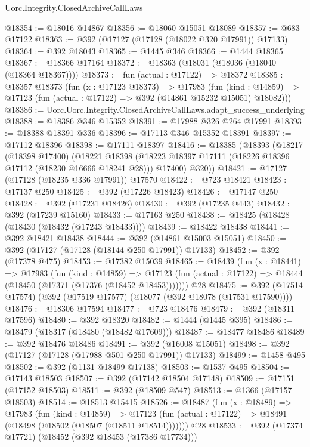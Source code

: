 \begin{lexlean}{Uorc.Integrity.ClosedArchiveCallLaws}
\begin{coremodule}
@18354 := @18016 @14867
@18356 := @18060 @15051 @18089
@18357 := @683 @17122
@18363 := @392 (@17127 (@17128 (@18022 @320 @17991)) @17133)
@18364 := @392 @18043
@18365 := @1445 @346
@18366 := @1444 @18365
@18367 := @18366 @17164
@18372 := @18363 (@18031 (@18036 (@18040 (@18364 @18367))))
@18373 := fun (actual : @17122) => @18372
@18385 := @18357
    @18373
    (fun (x : @17123 @18373) =>
    @17983
      (fun (kind : @14859) => @17123 (fun (actual : @17122) => @392 (@14861 @15232 @15051) @18082)))
@18386 := Uorc.Uorc.Integrity.ClosedArchiveCallLaws.adapt_success_underlying
@18388 := @18386 @346 @15352
@18391 := @17988 @326 @264 @17991
@18393 := @18388 @18391 @336
@18396 := @17113 @346 @15352 @18391
@18397 := @17112 @18396
@18398 := @17111 @18397
@18416 := @18385
    (@18393
      (@18217
        (@18398 @17400)
        (@18221
          @18398
          (@18223 @18397 @17111 (@18226 @18396 @17112 (@18230 @16666 @18241 @28)))
          @17400)
        @320))
@18421 := @17127 (@17128 (@18235 @336 @17991)) @17570
@18422 := @723 @18421
@18423 := @17137 @250
@18425 := @392 (@17226 @18423)
@18426 := @17147 @250
@18428 := @392 (@17231 @18426)
@18430 := @392 (@17235 @443)
@18432 := @392 (@17239 @15160)
@18433 := @17163 @250
@18438 := @18425 (@18428 (@18430 (@18432 (@17243 @18433))))
@18439 := @18422 @18438
@18441 := @392 @18421 @18438
@18444 := @392 (@14861 @15003 @15051)
@18450 := @392 (@17127 (@17128 (@18144 @250 @17991)) @17133)
@18452 := @392 (@17378 @475)
@18453 := @17382 @15039
@18465 := @18439
    (fun (x : @18441) =>
    @17983
      (fun (kind : @14859) =>
      @17123 (fun (actual : @17122) => @18444 (@18450 (@17371 (@17376 (@18452 @18453)))))))
    @28
@18475 := @392 (@17514 @17574) (@392 (@17519 @17577) (@18077 (@392 @18078 (@17531 @17590))))
@18476 := @18306 @17594
@18477 := @723 @18476
@18479 := @392 (@18311 @17596)
@18480 := @392 @18320
@18482 := @1444 (@1445 @395)
@18486 := @18479 (@18317 (@18480 (@18482 @17609)))
@18487 := @18477 @18486
@18489 := @392 @18476 @18486
@18491 := @392 (@16008 @15051)
@18498 := @392 (@17127 (@17128 (@17988 @501 @250 @17991)) @17133)
@18499 := @1458 @495
@18502 := @392 (@1131 @18499 @17138)
@18503 := @1537 @495
@18504 := @17143 @18503
@18507 := @392 (@17142 @18504 @17148)
@18509 := @17151 (@17152 @18503)
@18511 := @392 (@18509 @547)
@18513 := @1366 (@17157 @18503)
@18514 := @18513 @15415
@18526 := @18487
    (fun (x : @18489) =>
    @17983
      (fun (kind : @14859) =>
      @17123 (fun (actual : @17122) => @18491 (@18498 (@18502 (@18507 (@18511 @18514)))))))
    @28
@18533 := @392 (@17374 @17721) (@18452 (@392 @18453 (@17386 @17734)))

\end{coremodule}
\end{lexlean}
